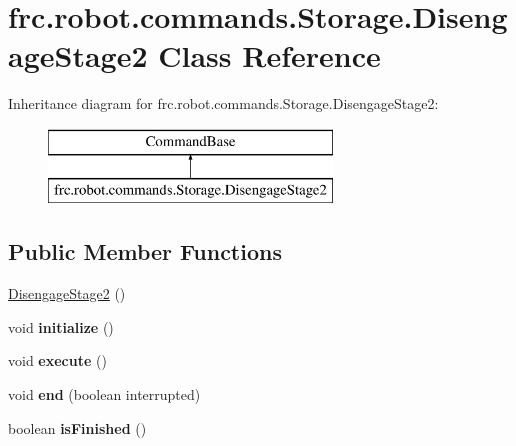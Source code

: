 \hypertarget{classfrc_1_1robot_1_1commands_1_1_storage_1_1_disengage_stage2}{}\section{frc.\+robot.\+commands.\+Storage.\+Disengage\+Stage2 Class Reference}
\label{classfrc_1_1robot_1_1commands_1_1_storage_1_1_disengage_stage2}
Inheritance diagram for frc.\+robot.\+commands.\+Storage.\+Disengage\+Stage2\+:\begin{figure}[H]
\begin{center}
\leavevmode
\includegraphics[height=2.000000cm]{classfrc_1_1robot_1_1commands_1_1_storage_1_1_disengage_stage2}
\end{center}
\end{figure}
\subsection*{Public Member Functions}
\begin{DoxyCompactItemize}
\item 
\mbox{\hyperlink{classfrc_1_1robot_1_1commands_1_1_storage_1_1_disengage_stage2_aa2184e21c1cdc76b99afcda89e44cde2}{Disengage\+Stage2}} ()
\item 
\mbox{\label{classfrc_1_1robot_1_1commands_1_1_storage_1_1_disengage_stage2_a90956defc04cc897fc0be2b348cc9f9e}} 
void {\bfseries initialize} ()
\item 
\mbox{\label{classfrc_1_1robot_1_1commands_1_1_storage_1_1_disengage_stage2_aa28199b06a681abb3b4a0879c8ee65bc}} 
void {\bfseries execute} ()
\item 
\mbox{\label{classfrc_1_1robot_1_1commands_1_1_storage_1_1_disengage_stage2_afcc22adede78deeefb43b3366af8829b}} 
void {\bfseries end} (boolean interrupted)
\item 
\mbox{\label{classfrc_1_1robot_1_1commands_1_1_storage_1_1_disengage_stage2_a95ada21b3f8bd6c91256f644fcffe911}} 
boolean {\bfseries is\+Finished} ()
\end{DoxyCompactItemize}


